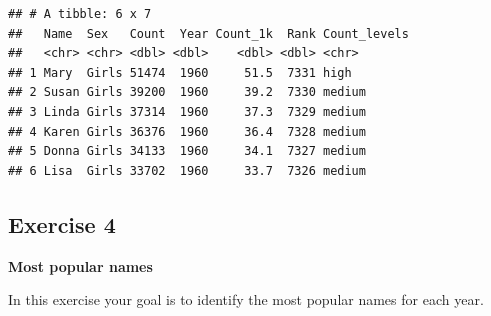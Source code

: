 \documentclass[
]{book}
\begin{document}
\begin{verbatim}
## # A tibble: 6 x 7
##   Name  Sex   Count  Year Count_1k  Rank Count_levels
##   <chr> <chr> <dbl> <dbl>    <dbl> <dbl> <chr>       
## 1 Mary  Girls 51474  1960     51.5  7331 high        
## 2 Susan Girls 39200  1960     39.2  7330 medium      
## 3 Linda Girls 37314  1960     37.3  7329 medium      
## 4 Karen Girls 36376  1960     36.4  7328 medium      
## 5 Donna Girls 34133  1960     34.1  7327 medium      
## 6 Lisa  Girls 33702  1960     33.7  7326 medium
\end{verbatim}

\hypertarget{exercise-4}{%
\subsection{Exercise 4}\label{exercise-4}}

\textbf{Most popular names}

In this exercise your goal is to identify the most popular names for each year.
\end{document}
